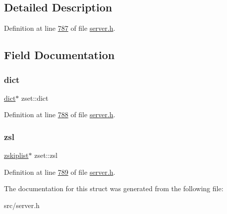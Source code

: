 \subsection{Detailed Description}


Definition at line \hyperlink{server_8h_source_l00787}{787} of file \hyperlink{server_8h_source}{server.\+h}.



\subsection{Field Documentation}
\mbox{\label{structzset_ac0cad0ee575e89fbc809acef7ca685a9}} 
\subsubsection{\texorpdfstring{dict}{dict}}
{\footnotesize\ttfamily \hyperlink{structdict}{dict}$\ast$ zset\+::dict}



Definition at line \hyperlink{server_8h_source_l00788}{788} of file \hyperlink{server_8h_source}{server.\+h}.

\mbox{\label{structzset_ab52b4c6fca4654afba8002d76d109c79}} 
\subsubsection{\texorpdfstring{zsl}{zsl}}
{\footnotesize\ttfamily \hyperlink{structzskiplist}{zskiplist}$\ast$ zset\+::zsl}



Definition at line \hyperlink{server_8h_source_l00789}{789} of file \hyperlink{server_8h_source}{server.\+h}.



The documentation for this struct was generated from the following file\+:\begin{DoxyCompactItemize}
\item 
src/server.\+h\end{DoxyCompactItemize}
